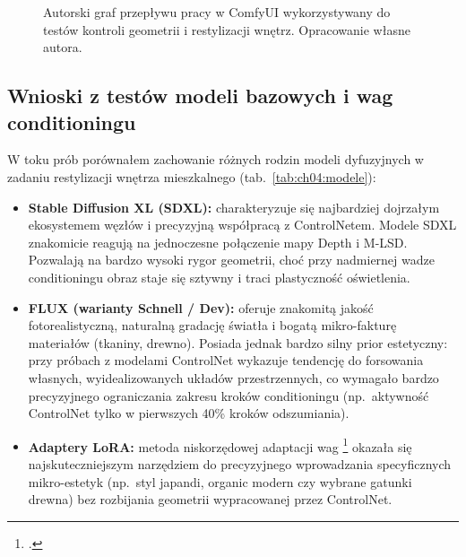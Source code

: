 \begin{figure}[htbp]
  \centering
  \caption{Autorski graf przepływu pracy w ComfyUI wykorzystywany do testów kontroli geometrii i restylizacji wnętrz.
  Opracowanie własne autora.}
  \label{fig:ch04:comfyui-graph}
\end{figure}

\subsection{Wnioski z testów modeli bazowych i wag conditioningu}
\label{ch04:sec:modele-testy}

W toku prób porównałem zachowanie różnych rodzin modeli dyfuzyjnych w zadaniu restylizacji wnętrza mieszkalnego (tab.~\ref{tab:ch04:modele}):
\begin{itemize}
  \item \textbf{Stable Diffusion XL (SDXL):} charakteryzuje się najbardziej dojrzałym ekosystemem węzłów i precyzyjną współpracą z ControlNetem. Modele SDXL znakomicie reagują na jednoczesne połączenie mapy Depth i M-LSD. Pozwalają na bardzo wysoki rygor geometrii, choć przy nadmiernej wadze conditioningu obraz staje się sztywny i traci plastyczność oświetlenia.
  \item \textbf{FLUX (warianty Schnell / Dev):} oferuje znakomitą jakość fotorealistyczną, naturalną gradację światła i bogatą mikro-fakturę materiałów (tkaniny, drewno). Posiada jednak bardzo silny prior estetyczny: przy próbach z modelami ControlNet wykazuje tendencję do forsowania własnych, wyidealizowanych układów przestrzennych, co wymagało bardzo precyzyjnego ograniczania zakresu kroków conditioningu (np.\ aktywność ControlNet tylko w pierwszych 40\% kroków odszumiania).
  \item \textbf{Adaptery LoRA:} metoda niskorzędowej adaptacji wag \footcite{hu2022lora} okazała się najskuteczniejszym narzędziem do precyzyjnego wprowadzania specyficznych mikro-estetyk (np.\ styl japandi, organic modern czy wybrane gatunki drewna) bez rozbijania geometrii wypracowanej przez ControlNet.
\end{itemize}


